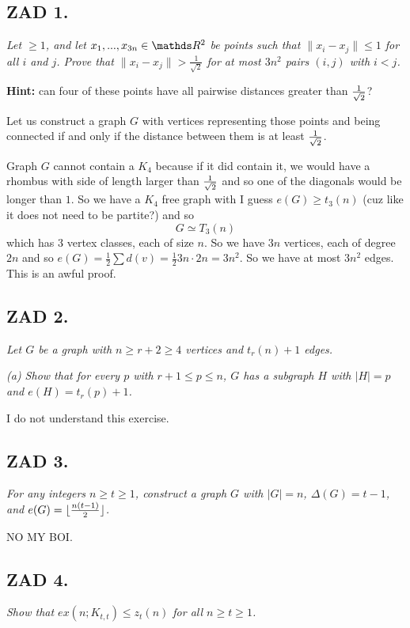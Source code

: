 \documentclass{article}[13pt]
\begin{document}
\subsection*{ZAD 1.}
\emph{Let $\geq1$, and let $x_1,...,x_{3n}\in\R^2$ be points such that $\|x_i-x_j\|\leq1$ for all $i$ and $j$. Prove that $\|x_i-x_j\|>\frac1{\sqrt{2}}$ for at most $3n^2$ pairs $(i,j)$ with $i<j$.}

\textbf{Hint:} can four of these points have all pairwise distances greater than ${1\over \sqrt{2}}$?
\medskip

Let us construct a graph $G$ with vertices representing those points and being connected if and only if the distance between them is at least ${1\over\sqrt{2}}$.

Graph $G$ cannot contain a $K_4$ because if it did contain it, we would have a rhombus with side of length larger than ${1\over\sqrt2}$ and so one of the diagonals would be longer than $1$. So we have a $K_4$ free graph with I guess $e(G)\geq t_3(n)$ (cuz like it does not need to be partite?) and so
$$G\simeq T_3(n)$$
which has $3$ vertex classes, each of size $n$. So we have $3n$ vertices, each of degree $2n$ and so $e(G)=\frac12\sum d(v)=\frac12 3n\cdot 2n=3n^2$. So we have at most $3n^2$ edges. This is an awful proof.


\subsection*{ZAD 2.}
\emph{Let $G$ be a graph with $n\geq r+2\geq 4$ vertices and $t_r(n)+1$ edges.}

\emph{(a) Show that for every $p$ with $r+1\leq p\leq n$, $G$ has a subgraph $H$ with $|H|=p$ and $e(H)=t_r(p)+1$.}
\medskip

I do not understand this exercise.

\subsection*{ZAD 3.}
\emph{For any integers $n\geq t\geq1$, construct a graph $G$ with $|G|=n$, $\Delta(G)=t-1$, and $e(G)=\lfloor{n(t-1)\over2}\rfloor$.}

NO MY BOI.

\subsection*{ZAD 4.}
\emph{Show that $ex(n;K_{t,t})\leq z_t(n)$ for all $n\geq t\geq1$.}
\medskip
\end{document}
